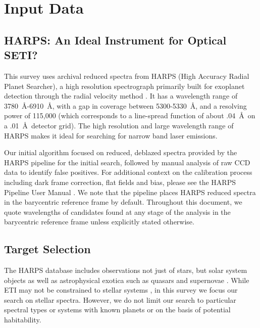 \documentclass[twocolumn]{aastex701}
\begin{document}
\section{Input Data}
\subsection{HARPS: An Ideal Instrument for Optical SETI?}
This survey uses archival reduced spectra from HARPS (High Accuracy Radial Planet Searcher), a high resolution spectrograph primarily built for exoplanet detection through the radial velocity method \citep{HARPS_specs}. It has a wavelength range of 3780~\AA-6910~\AA, with a gap in coverage between 5300-5330~\AA, and a resolving power of 115,000 (which corresponds to a line-spread function of about .04~\AA~on a .01~\AA~detector grid). The high resolution and large wavelength range of HARPS makes it ideal for searching for narrow band laser emissions. 

Our initial algorithm focused on reduced, deblazed spectra provided by the HARPS pipeline for the initial search, followed by manual analysis of raw CCD data to identify false positives.  For additional context on the calibration process including dark frame correction, flat fields and bias, please see the HARPS Pipeline User Manual \citep{UserManual}. We note that the pipeline places HARPS reduced spectra in the barycentric reference frame by default. Throughout this document, we quote wavelengths of candidates found at any stage of the analysis in the barycentric reference frame unless explicitly stated otherwise.
  
\subsection{Target Selection}
\label{Target_Selection}
The HARPS database includes observations not just of stars, but solar system objects as well as  astrophysical exotica such as quasars and supernovae \citep{trifonov_2020}.  While ETI may not be constrained to stellar systems \citep{CIRKOVIC2018289}, in this survey we focus our search on stellar spectra. However, we do not limit our search to particular spectral types or systems with known planets or on the basis of potential habitability.
\end{document}
